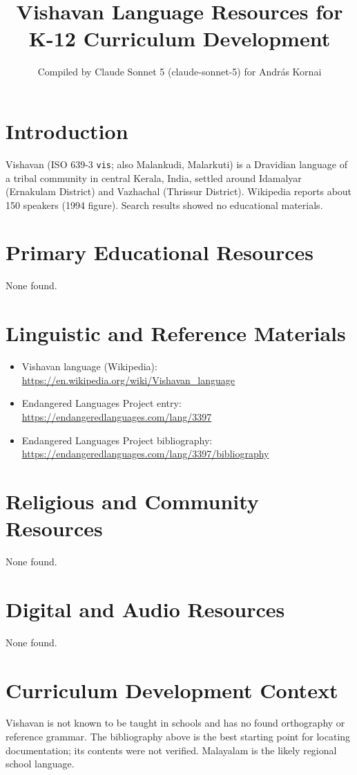 \documentclass[12pt]{article}
\title{Vishavan Language Resources for K-12 Curriculum Development}
\author{Compiled by Claude Sonnet 5 (claude-sonnet-5) for Andr\'as Kornai}
\date{}
\begin{document}
\maketitle

\section{Introduction}
Vishavan (ISO 639-3 \texttt{vis}; also Malankudi, Malarkuti) is a Dravidian language of a tribal community in central Kerala, India, settled around Idamalyar (Ernakulam District) and Vazhachal (Thrissur District). Wikipedia reports about 150 speakers (1994 figure). Search results showed no educational materials.

\section{Primary Educational Resources}
None found.

\section{Linguistic and Reference Materials}
\begin{itemize}
\item Vishavan language (Wikipedia): \url{https://en.wikipedia.org/wiki/Vishavan_language}
\item Endangered Languages Project entry: \url{https://endangeredlanguages.com/lang/3397}
\item Endangered Languages Project bibliography: \url{https://endangeredlanguages.com/lang/3397/bibliography}
\end{itemize}

\section{Religious and Community Resources}
None found.

\section{Digital and Audio Resources}
None found.

\section{Curriculum Development Context}
Vishavan is not known to be taught in schools and has no found orthography or reference grammar. The bibliography above is the best starting point for locating documentation; its contents were not verified. Malayalam is the likely regional school language.
\end{document}
